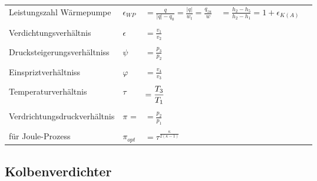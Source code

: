 \documentclass[twocolumn]{article}
\begin{document}
\begin{tabular}{lllll}
	Leistungszahl Wärmepumpe &
	$\epsilon_{WP}$ & $\displaystyle = \frac{q}{|q| - q_0} = \frac{|q|}{w_t} = \frac{q_{zu}}{w}$ &$\displaystyle = \frac{h_2 - h_5}{h_2 - h_1} = 1 + \epsilon_{K(A)}$ \\\\
	Verdichtungsverhältnis &
	$\epsilon$ &$\displaystyle = \frac{v_1}{v_2}$ \\\\
	Drucksteigerungsverhältniss &
	$\psi$ &$\displaystyle = \frac{p_3}{p_2}$ \\\\
	Einspriztverhältniss &
	$\varphi $ &$\displaystyle = \frac{v_4}{v_3}$ \\\\
	Temperaturverhältnis &
	$\tau$ &$ \displaystyle \displaystyle =\frac{T_3}{T_1}$ \\\\
	Verdrichtungsdruckverhältnis &
	$\pi$ = & $ \displaystyle  = \frac{p_2}{p_1}$ \\\\
	für Joule-Prozess &
	$\pi_{opt}$ & $ \displaystyle = \tau^{\frac{\kappa}{2(\kappa -1)}}$ \\
	
	
\end{tabular}

\pagebreak

%
%
%
%
%
%
%
%	

\subsection*{Kolbenverdichter}
\end{document}
